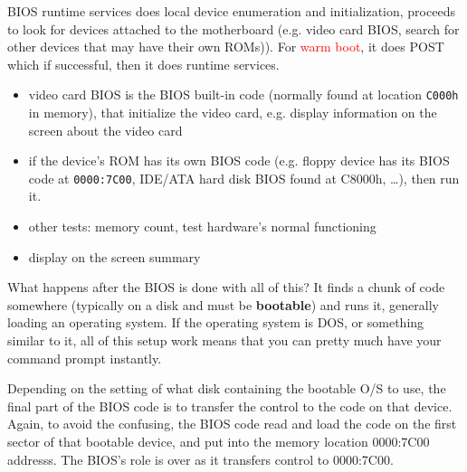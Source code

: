 BIOS runtime services does local device enumeration and initialization, proceeds
to look for devices attached to the motherboard (e.g. video card BIOS, search
for other devices that may have their own ROMs)). For \textcolor{red}{warm
boot}, it does POST which if successful, then it does runtime services.

\begin{itemize}
  \item video card BIOS is the BIOS built-in code (normally found at location
  \verb!C000h! in memory), that initialize the video card, e.g. display
  information on the screen about the video card
  
  \item if the device's ROM has its own BIOS code (e.g. floppy device has its
  BIOS code at \verb!0000:7C00!, IDE/ATA hard disk BIOS found at C8000h,
  \ldots), then run it.
  
  \item other tests: memory count, test hardware's normal functioning \item
  display on the screen summary
\end{itemize}

What happens after the BIOS is done with all of this? It finds a chunk of code
somewhere (typically on a disk and must be {\bf bootable}) and runs it,
generally loading an operating system. If the operating system is DOS, or
something similar to it, all of this setup work means that you can pretty much
have your command prompt instantly.

Depending on the setting of what disk containing the bootable O/S to use, the
final part of the BIOS code is to transfer the control to the code on that
device.  Again, to avoid the confusing, the BIOS code read and load the code on
the first sector of that bootable device, and put into the memory location
0000:7C00 addresss. The BIOS's role is over as it transfers control to
0000:7C00.

